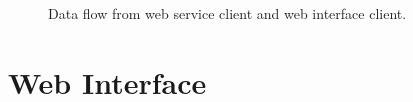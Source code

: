 \begin{figure}[H]
\centering
\captionsetup{justification=centering}
\caption{Data flow from web service client and web interface client.}
\label{fig:mvc}
\end{figure}

\section{Web Interface}
\label{sec:wi}
